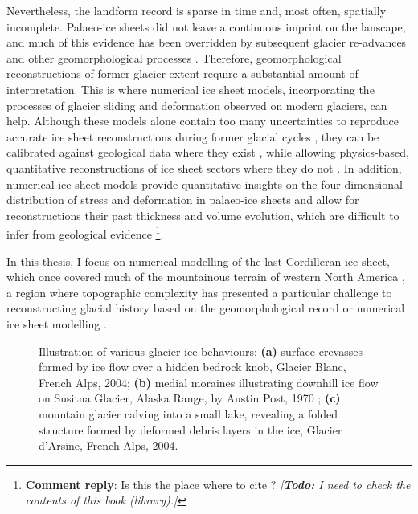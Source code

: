 \documentclass{article}
\newcommand{\renote}[1]{\footnote{\textbf{Comment reply}: #1}}
\newcommand{\todo}[1]{\emph{[\textbf{Todo:} #1]}}
\newcommand{\subgraphics}[3][,]{%
  \setbox1=\hbox{\texttt{[image: \#3]}}%
  \leavevmode\rlap{\usebox1}%
  \rlap{\hspace*{0.25em}
        \raisebox{\dimexpr\ht1-3ex}{\textbf{(#2)}}}%
  \phantom{\usebox1}%
}
\begin{document}
Nevertheless, the landform record is sparse in time and, most often, spatially
incomplete. Palaeo-ice sheets did not leave a continuous imprint on the
lanscape, and much of this evidence has been overridden by subsequent glacier
re-advances and other geomorphological processes \citep{Kleman.1994,
Kleman.etal.2006, Kleman.etal.2010}.
Therefore, geomorphological reconstructions of former glacier extent require a
substantial amount of interpretation. This is where numerical ice sheet models,
incorporating the processes of glacier sliding \citep[e.g.,][]{Weertman.1957}
and deformation \citep[e.g.,][]{Nye.1953} observed on modern glaciers, can
help. Although these models alone contain too many uncertainties to reproduce
accurate ice sheet reconstructions during former glacial cycles
\citep[e.g.,][]{Hebeler.etal.2008}, they can be calibrated against geological
data where they exist \citep{Napieralski.etal.2007}, while allowing
physics-based, quantitative reconstructions of ice sheet sectors where they do
not
\citep[e.g.,][]{Marshall.etal.2002, Tarasov.Peltier.2004}.
In addition, numerical ice sheet models provide quantitative insights on the
four-dimensional distribution of stress and deformation in palaeo-ice sheets
and allow for reconstructions their past thickness and volume evolution, which
are difficult to infer from geological evidence
\renote{
    Is this the place where to cite \citep{Denton.Hughes.1981}? \todo{I need to
    check the contents of this book (library).}
}.

In this thesis, I focus on numerical modelling of the last Cordilleran ice
sheet, which once covered much of the mountainous terrain of western North
America \citep{Dawson.1888}, a region where topographic complexity has
presented a particular challenge to reconstructing glacial history based on the
geomorphological record \citep[e.g.,][]{Kleman.etal.2010} or numerical ice
sheet modelling \citep{Robert.1991}.

\begin{figure}
  \centering
  \makebox[0pt]{
    \subgraphics{a}{photo-glacier-crevasses}
    \hspace{1cm}
    \subgraphics{b}{photo-glacier-susitna}
    \hspace{1cm}
    \subgraphics{c}{photo-glacier-fold}
  }
  \caption{Illustration of various glacier ice behaviours:
           \textbf{(a)} surface crevasses formed by ice flow over a hidden
           bedrock knob, Glacier Blanc, French Alps, 2004;
           \textbf{(b)} medial moraines illustrating downhill ice flow on
           Susitna Glacier, Alaska Range, by Austin Post, 1970
           \citep{NSIDC.2009};
           \textbf{(c)} mountain glacier calving into a small lake, revealing a
           folded structure formed by deformed debris layers in the ice,
           Glacier d'Arsine, French Alps, 2004.}
  \label{fig:glacier-mechanics}
\end{figure}
\end{document}
